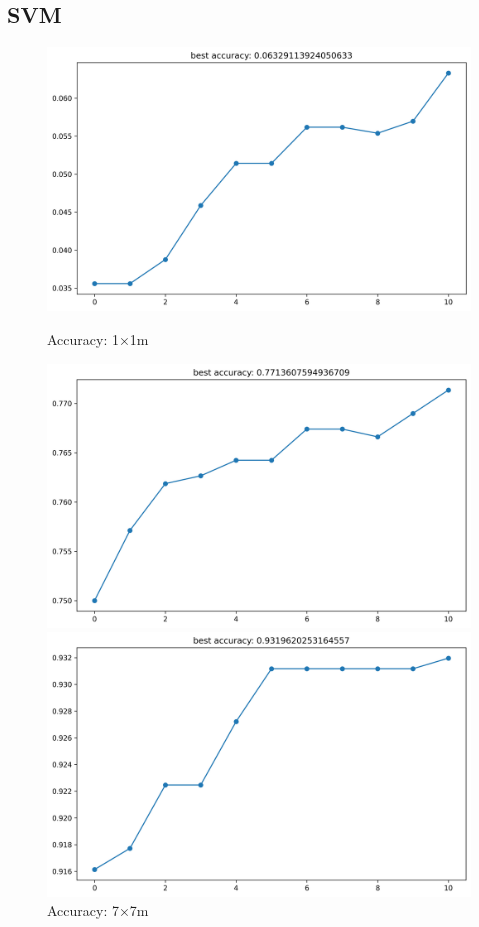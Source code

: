 \documentclass[runningheads]{llncs}
\begin{document}
\clearpage

\subsection*{SVM}

\begin{figure}[H]
	\centering
	\begin{minipage}{0.32\textwidth}
		\centering
		\includegraphics[width=\textwidth]{figures/svm_acc_1.png}
		\caption*{Accuracy: 1×1m}
	\end{minipage}
	\hfill
	\begin{minipage}{0.32\textwidth}
		\centering
		\includegraphics[width=\textwidth]{figures/svm_acc_7.png}
		\caption*{Accuracy: 7×7m}
	\end{minipage}
	\hfill
	\begin{minipage}{0.32\textwidth}
		\centering
		\includegraphics[width=\textwidth]{figures/svm_acc_15.png}

\end{minipage}
\end{figure}
\end{document}
